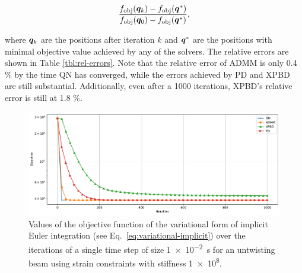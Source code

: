 \begin{equation}\label{eq:rel-error}
    \frac{f_{\text{obj}}(\bm{q}_k) - f_{\text{obj}}(\bm{q}^*)}{f_{\text{obj}}(\bm{q}_0) - f_{\text{obj}}(\bm{q}^*)},
\end{equation}

\noindent where $\bm{q}_k$ are the positions after iteration $k$ and $\bm{q}^*$ are the positions with minimal objective value
achieved by any of the solvers. The relative errors are shown in Table \ref{tbl:rel-errors}. Note that the relative error of ADMM is only 
0.4 \% by the time QN has converged, while the errors achieved by PD and XPBD are still substantial. Additionally, even after a 1000 iterations, XPBD's relative error 
is still at 1.8 \%.

\begin{figure}[h]
    \includegraphics[width=\textwidth]{figures/strain_beam_untwist_objectives.pdf}
    \caption{Values of the objective function of the variational form of implicit Euler integration (see Eq.\ \ref{eq:variational-implicit}) over the iterations of a single time 
        step of size \SI{1e-2}{\second} for an untwisting beam using strain constraints with stiffness \num{1e8}.}
    \label{fig:strain-beam-untwist-objectives}
\end{figure}

